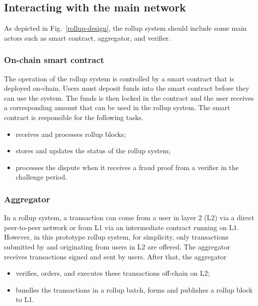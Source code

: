 \documentclass{article}
\begin{document}
\subsection{Interacting with the main network}
As depicted in Fig.~\ref{rollup-design}, the rollup system should include some main actors such as smart contract, aggregator, and verifier.

\subsubsection{On-chain smart contract}
The operation of the rollup system is controlled by a smart contract that is deployed on-chain. Users must deposit funds into the smart contract before they can use the system. The funds is then locked in the contract and the user receives a corresponding amount that can be used in the rollup system. The smart contract is responsible  for the following tasks.
\begin{itemize} 
\item receives and processes rollup blocks; 
\item stores and updates the status of the rollup system;  
\item processes the dispute when it receives a fraud proof from a verifier in the challenge period.
\end{itemize}

\subsubsection{Aggregator}
In a rollup system, a transaction can come from a user in layer 2 (L2) via a direct peer-to-peer network or from L1 via an intermediate contract running on L1. However, in this prototype rollup system, for simplicity, only transactions submitted by and originating from users in L2 are offered. The aggregator receives transactions signed and sent by users. After that, the aggregator
\begin{itemize} 
\item verifies, orders, and executes these transactions off-chain on L2; 
\item bundles the transactions in a rollup batch, forms and publishes a rollup block to L1. 
\end{itemize}
\end{document}
